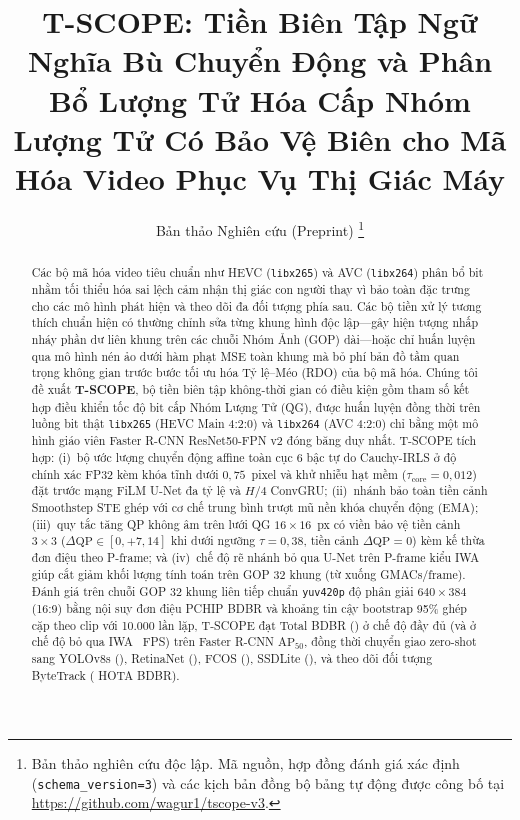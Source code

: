 \documentclass[journal]{IEEEtran}
\begin{document}
\title{T-SCOPE: Tiền Biên Tập Ngữ Nghĩa Bù Chuyển Động và Phân Bổ Lượng Tử Hóa Cấp Nhóm Lượng Tử Có Bảo Vệ Biên cho Mã Hóa Video Phục Vụ Thị Giác Máy}

\author{Bản thảo Nghiên cứu (Preprint)%
\thanks{Bản thảo nghiên cứu độc lập. Mã nguồn, hợp đồng đánh giá xác định (\texttt{schema\_version=3}) và các kịch bản đồng bộ bảng tự động được công bố tại \url{https://github.com/wagur1/tscope-v3}.}}


\maketitle

\begin{abstract}
Các bộ mã hóa video tiêu chuẩn như HEVC (\texttt{libx265}) và AVC (\texttt{libx264}) phân bổ bit nhằm tối thiểu hóa sai lệch cảm nhận thị giác con người thay vì bảo toàn đặc trưng cho các mô hình phát hiện và theo dõi đa đối tượng phía sau. Các bộ tiền xử lý tương thích chuẩn hiện có thường chỉnh sửa từng khung hình độc lập---gây hiện tượng nhấp nháy phần dư liên khung trên các chuỗi Nhóm Ảnh (GOP) dài---hoặc chỉ huấn luyện qua mô hình nén ảo dưới hàm phạt MSE toàn khung mà bỏ phí bản đồ tầm quan trọng không gian trước bước tối ưu hóa Tỷ lệ--Méo (RDO) của bộ mã hóa. Chúng tôi đề xuất \textbf{T-SCOPE}, bộ tiền biên tập không-thời gian có điều kiện gồm \tscopeTotalParams{} tham số kết hợp điều khiển tốc độ bit cấp Nhóm Lượng Tử (QG), được huấn luyện đồng thời trên luồng bit thật \texttt{libx265} (HEVC Main 4:2:0) và \texttt{libx264} (AVC 4:2:0) chỉ bằng một mô hình giáo viên Faster R-CNN ResNet50-FPN v2 đóng băng duy nhất. T-SCOPE tích hợp: (i)~bộ ước lượng chuyển động affine toàn cục 6 bậc tự do Cauchy-IRLS ở độ chính xác FP32 kèm khóa tĩnh dưới $0{,}75$~pixel và khử nhiễu hạt mềm ($\tau_{\mathrm{core}}=0{,}012$) đặt trước mạng FiLM U-Net đa tỷ lệ và $H/4$ ConvGRU; (ii)~nhánh bảo toàn tiền cảnh Smoothstep STE ghép với cơ chế trung bình trượt mũ nền khóa chuyển động (EMA); (iii)~quy tắc tăng QP không âm trên lưới QG $16\times 16$~px có viền bảo vệ tiền cảnh $3\times 3$ ($\Delta\mathrm{QP} \in [0, +7{,}14]$ khi dưới ngưỡng $\tau=0{,}38$, tiền cảnh $\Delta\mathrm{QP}=0$) kèm kế thừa đơn điệu theo P-frame; và (iv)~chế độ rẽ nhánh bỏ qua U-Net trên P-frame kiểu IWA giúp cắt giảm \tscopeIwaAnalyticalGmacSaving{} khối lượng tính toán trên GOP 32 khung (từ \tscopeFullGmacsPerFrame{} xuống \tscopeIwaGmacsPerFrame{} GMACs/frame). Đánh giá trên chuỗi GOP 32 khung liên tiếp chuẩn \texttt{yuv420p} độ phân giải $640\times 384$ (16:9) bằng nội suy đơn điệu PCHIP BDBR và khoảng tin cậy bootstrap 95\% ghép cặp theo clip với 10.000 lần lặp, T-SCOPE đạt \tscopeFullTotBdbrFrcnnApFifty{} Total BDBR (\tscopeFullTotBdbrFrcnnApFiftyCi{}) ở chế độ đầy đủ (và \tscopeIwaTotBdbrFrcnnApFifty{} ở chế độ bỏ qua IWA \tscopeIwaFps{}~FPS) trên Faster R-CNN $\mathrm{AP}_{50}$, đồng thời chuyển giao zero-shot sang YOLOv8s (\tscopeFullTotBdbrYoloApFifty{}), RetinaNet (\tscopeZeroShotRetinaBdbr{}), FCOS (\tscopeZeroShotFcosBdbr{}), SSDLite (\tscopeZeroShotSsdBdbr{}), và theo dõi đối tượng ByteTrack (\tscopeMotHotaBdbr{} HOTA BDBR).

\end{abstract}
\end{document}
